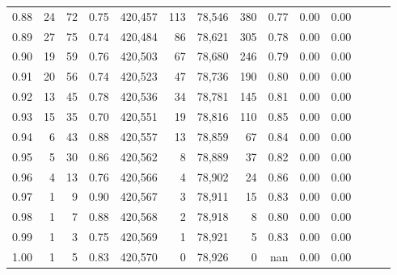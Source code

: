 \begin{tabular}{rrrrrrrrrrrrrr}
0.88 &      24 &     72 &  0.75 &  420,457 &      113 &  78,546 &     380 &  0.77 &  0.00 &      0.00 \\
0.89 &      27 &     75 &  0.74 &  420,484 &       86 &  78,621 &     305 &  0.78 &  0.00 &      0.00 \\
0.90 &      19 &     59 &  0.76 &  420,503 &       67 &  78,680 &     246 &  0.79 &  0.00 &      0.00 \\
0.91 &      20 &     56 &  0.74 &  420,523 &       47 &  78,736 &     190 &  0.80 &  0.00 &      0.00 \\
0.92 &      13 &     45 &  0.78 &  420,536 &       34 &  78,781 &     145 &  0.81 &  0.00 &      0.00 \\
0.93 &      15 &     35 &  0.70 &  420,551 &       19 &  78,816 &     110 &  0.85 &  0.00 &      0.00 \\
0.94 &       6 &     43 &  0.88 &  420,557 &       13 &  78,859 &      67 &  0.84 &  0.00 &      0.00 \\
0.95 &       5 &     30 &  0.86 &  420,562 &        8 &  78,889 &      37 &  0.82 &  0.00 &      0.00 \\
0.96 &       4 &     13 &  0.76 &  420,566 &        4 &  78,902 &      24 &  0.86 &  0.00 &      0.00 \\
0.97 &       1 &      9 &  0.90 &  420,567 &        3 &  78,911 &      15 &  0.83 &  0.00 &      0.00 \\
0.98 &       1 &      7 &  0.88 &  420,568 &        2 &  78,918 &       8 &  0.80 &  0.00 &      0.00 \\
0.99 &       1 &      3 &  0.75 &  420,569 &        1 &  78,921 &       5 &  0.83 &  0.00 &      0.00 \\
1.00 &       1 &      5 &  0.83 &  420,570 &        0 &  78,926 &       0 &   nan &  0.00 &      0.00 \\
\bottomrule
\end{tabular}
